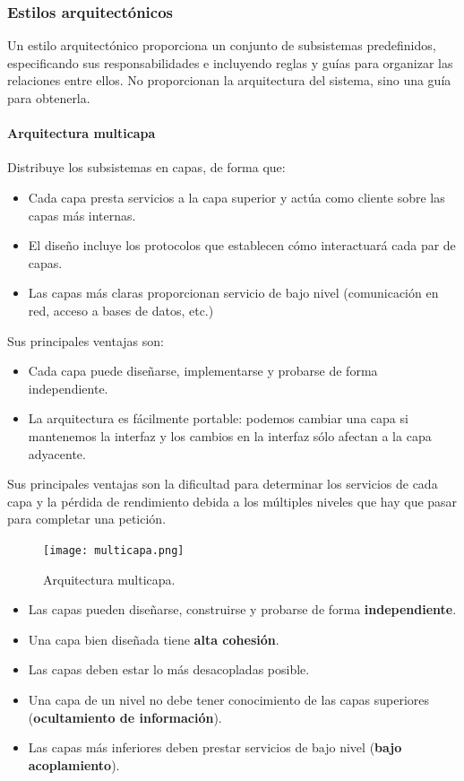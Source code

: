 \documentclass[12pt,spanish]{article}
\begin{document}
\subsubsection{Estilos arquitectónicos}

Un estilo arquitectónico proporciona un conjunto de subsistemas predefinidos, especificando sus responsabilidades e incluyendo reglas y guías para organizar las relaciones entre ellos. No proporcionan la arquitectura del sistema, sino una guía para obtenerla.

\paragraph{Arquitectura multicapa\\}

Distribuye los subsistemas en capas, de forma que:
\begin{itemize}
	\item Cada capa presta servicios a la capa superior y actúa como cliente sobre las capas más internas.
	\item El diseño incluye los protocolos que establecen cómo interactuará cada par de capas.
	\item Las capas más claras proporcionan servicio de bajo nivel (comunicación en red, acceso a bases de datos, etc.)
\end{itemize}

Sus principales ventajas son:

\begin{itemize}
	\item Cada capa puede diseñarse, implementarse y probarse de forma independiente.
	\item La arquitectura es fácilmente portable: podemos cambiar una capa si mantenemos la interfaz y los cambios en la interfaz sólo afectan a la capa adyacente.
\end{itemize}

Sus principales ventajas son la dificultad para determinar los servicios de cada capa y la pérdida de rendimiento debida a los múltiples niveles que hay que pasar para completar una petición.

\begin{figure}[H]
\centering
\texttt{[image: multicapa.png]}
\caption{Arquitectura multicapa.}
\end{figure}

\begin{itemize}
	\item Las capas pueden diseñarse, construirse y probarse de forma \textbf{independiente}.
	\item Una capa bien diseñada tiene \textbf{alta cohesión}.
	\item Las capas deben estar lo más desacopladas posible.
	\item Una capa de un nivel no debe tener conocimiento de las capas superiores (\textbf{ocultamiento de información}).
	\item Las capas más inferiores deben prestar servicios de bajo nivel (\textbf{bajo acoplamiento}).
\end{itemize}
\end{document}
